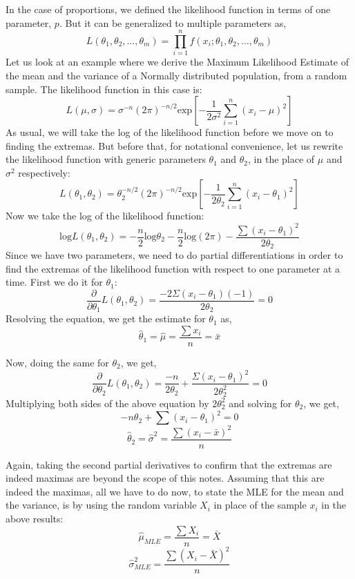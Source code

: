 In the case of proportions, we defined the likelihood function in terms of one parameter, $p$. But it can be generalized to multiple parameters as,
	\[ L(\theta_1,\theta_2,\ldots,\theta_m)=\prod\limits_{i=1}^n f(x_i;\theta_1,\theta_2,\ldots,\theta_m) \]
Let us look at an example where we derive the Maximum Likelihood Estimate of the mean and the variance of a Normally distributed population, from a random sample. The likelihood function in this case is:
	\[ L(\mu,\sigma)=\sigma^{-n}(2\pi)^{-n/2}\text{exp}\left[-\dfrac{1}{2\sigma^2}\sum\limits_{i=1}^n(x_i-\mu)^2\right] \]
As usual, we will take the log of the likelihood function before we move on to finding the extremas. But before that, for notational convenience, let us rewrite the likelihood function with generic parameters $\theta_1$ and $\theta_2$, in the place of $\mu$ and $\sigma^2$ respectively:
	\[ L(\theta_1,\theta_2)= \theta^{-n/2}_2(2\pi)^{-n/2}\text{exp}\left[-\dfrac{1}{2\theta_2}\sum\limits_{i=1}^n(x_i-\theta_1)^2\right] \]
Now we take the log of the likelihood function:
	\[\text{log} L(\theta_1,\theta_2)=-\dfrac{n}{2}\text{log}\theta_2-\dfrac{n}{2}\text{log}(2\pi)-\dfrac{\sum(x_i-\theta_1)^2}{2\theta_2} \]
Since we have two parameters, we need to do partial differentiations in order to find the extremas of the likelihood function with respect to one parameter at a time. First we do it for $\theta_1$:
	\[ \frac{\partial}{\partial \theta_1} L(\theta_1, \theta_2) = \frac{-2\Sigma(x_i - \theta_1)(-1)}{2\theta_2}  = 0\]
Resolving the equation, we get the estimate for $\theta_1$ as,
	\[ \hat{\theta}_1=\hat{\mu}=\dfrac{\sum x_i}{n}=\bar{x} \]

Now, doing the same for $\theta_2$, we get,
	\[ \frac{\partial}{\partial \theta_2} L(\theta_1, \theta_2) = \frac{-n}{2\theta_2} + \frac{\Sigma (x_i - \theta_1)^2}{2\theta_2^2} = 0\]
Multiplying both sides of the above equation by \( 2\theta_2^2 \) and solving for $\theta_2$, we get,
	\[ -n\theta_2 + \sum (x_i - \theta_1)^2 = 0 \]
	\[ \hat{\theta}_2 = \hat{\sigma}^2=\dfrac{\sum(x_i-\bar{x})^2}{n} \] 

Again, taking the second partial derivatives to confirm that the extremas are indeed maximas are beyond the scope of this notes. Assuming that this are indeed the maximas, all we have to do now, to state the MLE for the mean and the variance, is by using the random variable $X_i$ in place of the sample $x_i$ in the above results:
	\[ \hat{\mu}_{MLE} = \dfrac{\sum X_i}{n}=\bar{X} \]
	\[ \hat{\sigma}^2_{MLE} = \dfrac{\sum(X_i-\bar{X})^2}{n} \] 
	

